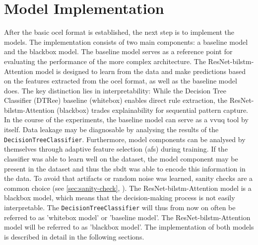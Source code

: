 \section{Model Implementation}

After the basic \gls{ocel} format is established, the next step is to implement the models. The implementation consists of two main components: a baseline model and the blackbox model. The baseline model serves as a reference point for evaluating the performance of the more complex architecture. The ResNet-\gls{bilstm}-Attention model is designed to learn from the data and make predictions based on the features extracted from the \gls{ocel} format, as well as the baseline model does. The key distinction lies in interpretability: While the Decision Tree Classifier (DTRee) baseline (whitebox) enables direct rule extraction, the ResNet-\gls{bilstm}-Attention (blackbox) trades explainability for sequential pattern capture. In the course of the experiments, the baseline model can serve as a \gls{vvuq} tool by itself. Data leakage may be diagnosable by analysing the results of the \texttt{DecisionTreeClassifier}. Furthermore, model components can be analysed by themselves through adaptive feature selection (\gls{afs}) during training. If the classifier was able to learn well on the dataset, the model component may be present in the dataset and thus the \gls{sbdt} was able to encode this information in the data. To avoid that artifacts or random noise was learned, sanity checks are a common choice (see \autoref{sec:sanity-check}, \autocite{adebayo2018sanity}). The ResNet-\gls{bilstm}-Attention model is a blackbox model, which means that the decision-making process is not easily interpretable. The \texttt{DecisionTreeClassifier} will thus from now on often be referred to as 'whitebox model' or 'baseline model'. The ResNet-\gls{bilstm}-Attention model will be referred to as 'blackbox model'. The implementation of both models is described in detail in the following sections.


